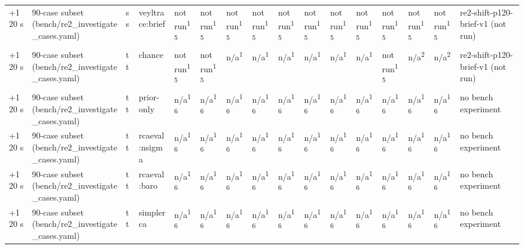 \begin{table}[t]
\begin{tabular}{llllllllllllllll}
+120 s & 90-case subset (bench/re2\_investigate\_cases.yaml) & ss & veyltrace:brief & not run\textsuperscript{15} & not run\textsuperscript{15} & not run\textsuperscript{15} & not run\textsuperscript{15} & not run\textsuperscript{15} & not run\textsuperscript{15} & not run\textsuperscript{15} & not run\textsuperscript{15} & not run\textsuperscript{15} & not run\textsuperscript{15} & not run\textsuperscript{15} & re2-shift-p120-brief-v1 (not run) \\
+120 s & 90-case subset (bench/re2\_investigate\_cases.yaml) & tt & chance & not run\textsuperscript{15} & not run\textsuperscript{15} & n/a\textsuperscript{1} & n/a\textsuperscript{1} & n/a\textsuperscript{1} & n/a\textsuperscript{1} & n/a\textsuperscript{1} & n/a\textsuperscript{1} & not run\textsuperscript{15} & n/a\textsuperscript{2} & n/a\textsuperscript{2} & re2-shift-p120-brief-v1 (not run) \\
+120 s & 90-case subset (bench/re2\_investigate\_cases.yaml) & tt & prior-only & n/a\textsuperscript{16} & n/a\textsuperscript{16} & n/a\textsuperscript{16} & n/a\textsuperscript{16} & n/a\textsuperscript{16} & n/a\textsuperscript{16} & n/a\textsuperscript{16} & n/a\textsuperscript{16} & n/a\textsuperscript{16} & n/a\textsuperscript{16} & n/a\textsuperscript{16} & no bench experiment \\
+120 s & 90-case subset (bench/re2\_investigate\_cases.yaml) & tt & rcaeval:nsigma & n/a\textsuperscript{16} & n/a\textsuperscript{16} & n/a\textsuperscript{16} & n/a\textsuperscript{16} & n/a\textsuperscript{16} & n/a\textsuperscript{16} & n/a\textsuperscript{16} & n/a\textsuperscript{16} & n/a\textsuperscript{16} & n/a\textsuperscript{16} & n/a\textsuperscript{16} & no bench experiment \\
+120 s & 90-case subset (bench/re2\_investigate\_cases.yaml) & tt & rcaeval:baro & n/a\textsuperscript{16} & n/a\textsuperscript{16} & n/a\textsuperscript{16} & n/a\textsuperscript{16} & n/a\textsuperscript{16} & n/a\textsuperscript{16} & n/a\textsuperscript{16} & n/a\textsuperscript{16} & n/a\textsuperscript{16} & n/a\textsuperscript{16} & n/a\textsuperscript{16} & no bench experiment \\
+120 s & 90-case subset (bench/re2\_investigate\_cases.yaml) & tt & simplerca & n/a\textsuperscript{16} & n/a\textsuperscript{16} & n/a\textsuperscript{16} & n/a\textsuperscript{16} & n/a\textsuperscript{16} & n/a\textsuperscript{16} & n/a\textsuperscript{16} & n/a\textsuperscript{16} & n/a\textsuperscript{16} & n/a\textsuperscript{16} & n/a\textsuperscript{16} & no bench experiment \\

\end{tabular}
\end{table}
